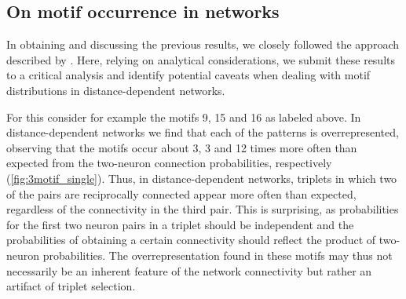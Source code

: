 \newpage

\subsection*{On motif occurrence in networks}

In obtaining and discussing the previous results, we closely followed
the approach described by \textcite{Song2005}. Here, relying on
analytical considerations, we submit these results to a critical
analysis and identify potential caveats when dealing with motif
distributions in distance-dependent networks.

For this consider for example the motifs 9, 15 and 16 as labeled
above. In distance-dependent networks we find that each of the
patterns is overrepresented, observing that the motifs occur about 3,
3 and 12 times more often than expected from the two-neuron connection
probabilities, respectively (\autoref{fig:3motif_single}). Thus, in
distance-dependent networks, triplets in which two of the pairs are
reciprocally connected appear more often than expected, regardless of
the connectivity in the third pair. This is surprising, as
probabilities for the first two neuron pairs in a triplet should be
independent and the probabilities of obtaining a certain connectivity
should reflect the product of two-neuron probabilities. The
overrepresentation found in these motifs may thus not necessarily be
an inherent feature of the network connectivity but rather an artifact
of triplet selection.

